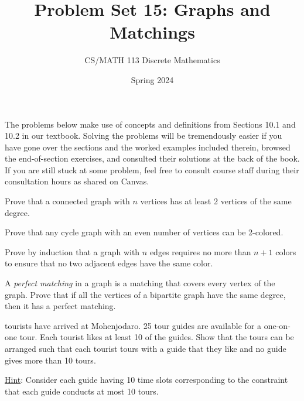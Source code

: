 \documentclass[a4paper]{exam}
\title{Problem Set 15: Graphs and Matchings}
\author{CS/MATH 113 Discrete Mathematics}
\date{Spring 2024}
\begin{document}
\maketitle

The problems below make use of concepts and definitions from Sections 10.1 and 10.2 in our textbook. Solving the problems will be tremendously easier if you have gone over the sections and the worked examples included therein, browsed the end-of-section exercises, and consulted their solutions at the back of the book. If you are still stuck at some problem, feel free to consult course staff during their consultation hours as shared on Canvas.

\begin{questions}
  
  \question Prove that a connected graph with $n$ vertices has at least 2 vertices of the same degree.
  \begin{solution}
  \end{solution}

  \question Prove that any cycle graph with an even number of vertices can be 2-colored.
  \begin{solution}
  \end{solution}

  \question Prove by induction that a graph with $n$ edges requires no more than $n+1$ colors to ensure that no two adjacent edges have the same color.
  \begin{solution}
  \end{solution}
  
  \question A \textit{perfect matching} in a graph is a matching that covers every vertex of the graph. Prove that if all the vertices of a bipartite graph have the same degree, then it has a perfect matching.
  \begin{solution}
  \end{solution}

   tourists have arrived at Mohenjodaro. 25 tour guides are available for a one-on-one tour. Each tourist likes at least 10 of the guides. Show that the tours can be arranged such that each tourist tours with a guide that they like and no guide gives more than 10 tours.

  \underline{Hint}: Consider each guide having 10 time slots corresponding to the constraint that each guide conducts at most 10 tours.
  \begin{solution}
  \end{solution}

\end{questions}
\end{document}
